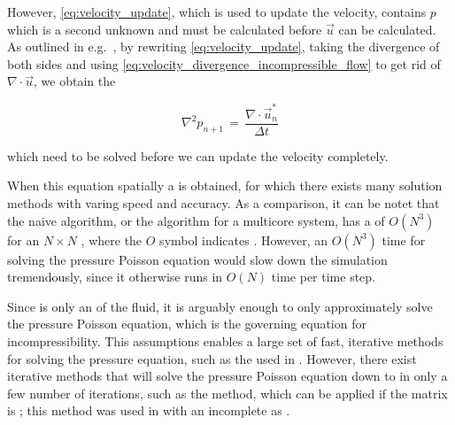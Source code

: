 However, \eqref{eq:velocity_update}, which is used to update the velocity, contains $p$ which is a second unknown and must be calculated before $\vec{u}$ can be calculated. As outlined in e.g.\ \citep{Losasso2004}, by rewriting \eqref{eq:velocity_update}, taking the divergence of both sides and using \eqref{eq:velocity_divergence_incompressible_flow} to get rid of $\nabla\cdot\vec{u}$, we obtain the 

\begin{equation} \label{eq:pressure_poissin_equation_incompressible_flow}
\nabla^2 p_{n+1} \,=\, \frac{\nabla\cdot\vec{u}^*_n}{\Delta t}
\end{equation}

which need to be solved before we can update the velocity completely.

When  this equation spatially a  is obtained, for which there exists many solution methods with varing speed and accuracy. As a comparison, it can be notet that the naive  algorithm, or the  algorithm for a multicore system, has a  of $O(N^3)$ for an $N\times N$ , where the $O$ symbol indicates . However, an $O(N^3)$ time for solving the pressure Poisson equation would slow down the simulation tremendously, since it otherwise runs in $O(N)$ time per time step.

Since \incompressibility is only an \approximate \property of the fluid, it is arguably enough to only approximately solve the pressure Poisson equation, which is the governing equation for incompressibility. This assumptions enables a large set of fast, iterative methods for solving the pressure equation, such as the   used in \citep{Popinet2003}. However, there exist iterative methods that will solve the pressure Poisson equation down to  in only a few number of iterations, such as the \PCG method, which can be applied if the matrix is ; this method was used in \citep{Losasso2004} with an incomplete  as \preconditioner.

